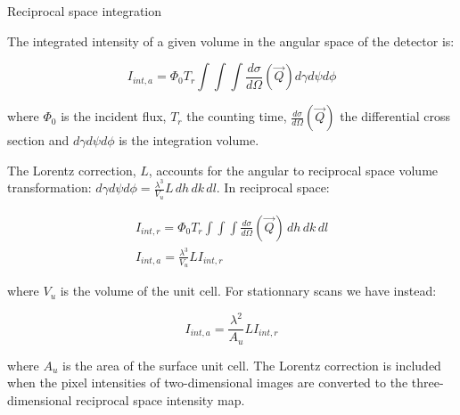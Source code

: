 \begin{frame}{Reciprocal space integration}

    The integrated intensity of a given volume in the angular space of the detector is:
    
    \begin{equation}
        I_{int,a} = \Phi_0 T_r \int \int \int \frac{d\sigma}{d\Omega}(\vec{Q})d\gamma d\psi d\phi
    \end{equation}
    
    where $\Phi_0$ is the incident flux, $T_r$ the counting time, $\frac{d\sigma}{d\Omega}(\vec{Q})$ the differential cross section and $d\gamma d\psi d\phi$ is the integration volume.
    
    The Lorentz correction, $L$, accounts for the angular to reciprocal space volume transformation:
    $d\gamma  d\psi d\phi = \frac{\lambda^3}{V_u} L \, dh \, dk \, dl$. In reciprocal space:
    
    \begin{gather}
        I_{int,r} = \Phi_0 T_r \int \int \int \frac{d\sigma}{d\Omega}(\vec{Q})\, dh \, dk \, dl \\
        I_{int,a} = \frac{\lambda^3}{V_u} L I_{int,r}
    \end{gather}
    
    where $V_u$ is the volume of the unit cell. For stationnary scans we have instead:
    
    \begin{equation}
        I_{int,a} = \frac{\lambda^2}{A_u} L I_{int,r}
    \end{equation}
    
    where $A_u$ is the area of the surface unit cell. The Lorentz correction is included when the pixel intensities of two-dimensional images are converted to the three-dimensional reciprocal space intensity map.

\end{frame}


